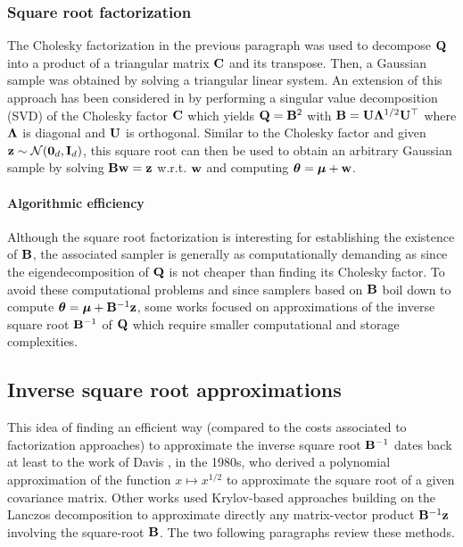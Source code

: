 \documentclass[nohypdvips,onefignum,onetabnum]{siamart171218}
\begin{document}
\subsubsection{Square root factorization}
The Cholesky factorization in the previous paragraph was used to decompose $\mathbf{Q}$ into a product of a triangular matrix $\mathbf{C}$ and its transpose. 
Then, a Gaussian sample was obtained by solving a triangular linear system.
An extension of this approach has been considered in \cite{Davis1987b} by performing a singular value decomposition (SVD) of the Cholesky factor $\mathbf{C}$ which yields $\mathbf{Q} = \mathbf{B}^2$ with $\mathbf{B} = \mathbf{U}\mathbf{\Lambda}^{1/2}\mathbf{U^{\top}}$ where $\mathbf{\Lambda}$ is diagonal and  $\mathbf{U}$ is orthogonal.
Similar to the Cholesky factor and given $\mathbf{z} \sim \mathcal{N}(\mathbf{0}_d,\mathbf{I}_d)$, this square root can then be used to obtain an arbitrary Gaussian sample by solving $\mathbf{B}\mathbf{w} = \mathbf{z}$ w.r.t. $\mathbf{w}$ and computing $\boldsymbol{\theta} = \boldsymbol{\mu} + \mathbf{w}$.

\paragraph{Algorithmic efficiency}
Although the square root factorization is interesting for establishing the existence of $\mathbf{B}$, the associated sampler is generally as computationally demanding as  since the eigendecomposition of $\mathbf{Q}$ is not cheaper than finding its Cholesky factor.
To avoid these computational problems and since samplers based on $\mathbf{B}$ boil down to compute $\boldsymbol{\theta} = \boldsymbol{\mu} + \mathbf{B}^{-1}\mathbf{z}$, some works focused on approximations of the inverse square root $\mathbf{B}^{-1}$ of $\mathbf{Q}$ which require smaller computational and storage complexities.


\subsection{Inverse square root approximations}
\label{subsec:polynomial_approx}
This idea of finding an efficient way (compared to the costs associated to factorization approaches) to approximate the inverse square root $\mathbf{B}^{-1}$ dates back at least to the work of Davis \cite{Davis1987b}, in the 1980s, who derived a polynomial approximation of the function $x \mapsto x^{1/2}$ to approximate the square root of a given covariance matrix.
Other works used Krylov-based approaches building on the Lanczos decomposition to approximate directly any matrix-vector product $\mathbf{B}^{-1}\mathbf{z}$ involving the square-root $\mathbf{B}$.
The two following paragraphs review these methods.
\end{document}

